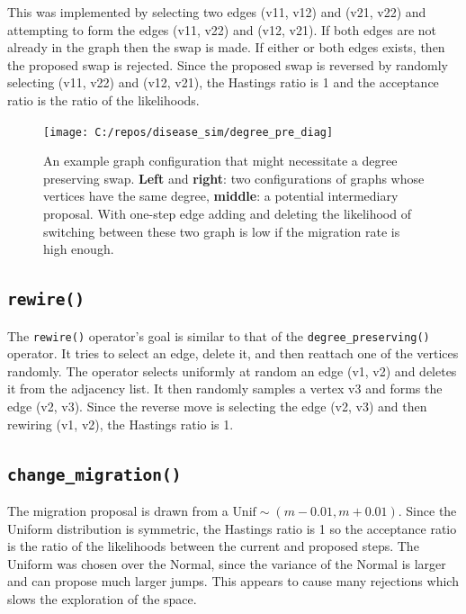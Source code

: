 \documentclass[11pt,a4paper]{article}
\begin{document}
This was implemented by selecting two edges (v11, v12) and (v21, v22)
and attempting to form the edges (v11, v22) and (v12, v21). If both
edges are not already in the graph then the swap is made. If either or
both edges exists, then the proposed swap is rejected. Since the
proposed swap is reversed by randomly selecting (v11, v22) and (v12,
v21), the Hastings ratio is 1 and the acceptance ratio is the ratio of
the likelihoods.

\begin{figure}

{\centering \texttt{[image: C:/repos/disease\_sim/degree\_pre\_diag]} 

}

\caption{\label{fig:deg_pre}An example graph configuration that might necessitate a degree preserving swap. \textbf{Left} and \textbf{right}: two configurations of graphs whose vertices have the same degree, \textbf{middle}: a potential intermediary proposal. With one-step edge adding and deleting the likelihood of switching between these two graph is low if the migration rate is high enough.}\label{fig:unnamed-chunk-2}
\end{figure}

\hypertarget{rewire}{%
\subsection{\texorpdfstring{\texttt{rewire()}}{rewire()}}\label{rewire}}

The \texttt{rewire()} operator's goal is similar to that of the
\texttt{degree\_preserving()} operator. It tries to select an edge,
delete it, and then reattach one of the vertices randomly. The operator
selects uniformly at random an edge (v1, v2) and deletes it from the
adjacency list. It then randomly samples a vertex v3 and forms the edge
(v2, v3). Since the reverse move is selecting the edge (v2, v3) and then
rewiring (v1, v2), the Hastings ratio is 1.

\hypertarget{change_migration}{%
\subsection{\texorpdfstring{\texttt{change\_migration()}}{change\_migration()}}\label{change_migration}}

The migration proposal is drawn from a
\(\text{Unif}\sim (m-0.01, m+0.01)\). Since the Uniform distribution is
symmetric, the Hastings ratio is 1 so the acceptance ratio is the ratio
of the likelihoods between the current and proposed steps. The Uniform
was chosen over the Normal, since the variance of the Normal is larger
and can propose much larger jumps. This appears to cause many rejections
which slows the exploration of the space.
\end{document}
